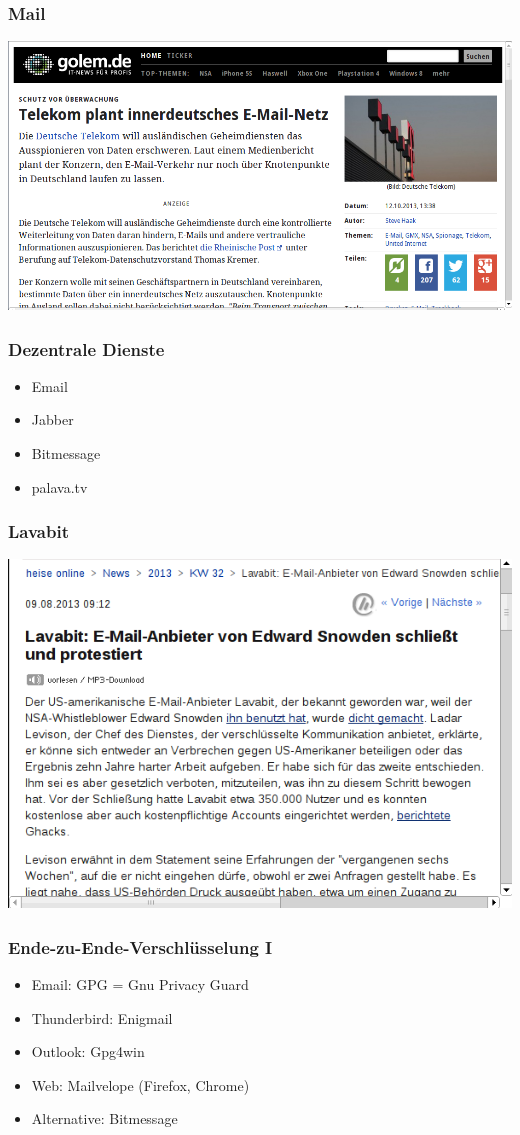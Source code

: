 \documentclass[12pt]{beamer}
\begin{document}
\begin{frame}
    \frametitle{Mail}
    \includegraphics[height=0.7\textheight]{img/telekom_mail.png}
\end{frame}

\begin{frame}
  \frametitle{Dezentrale Dienste}
    \begin{itemize}
      \item<2-> Email
      \item<3-> Jabber
      \item<4-> Bitmessage
      \item<5-> palava.tv
    \end{itemize}
\end{frame}

\begin{frame}
    \frametitle{Lavabit}
    \includegraphics[height=0.6\textheight]{img/heise_lavabit.png}
\end{frame}

\begin{frame}
    \frametitle{Ende-zu-Ende-Verschlüsselung I}
    \begin{itemize}\Large
      \item Email: GPG = Gnu Privacy Guard
      \item Thunderbird: Enigmail
      \item Outlook: Gpg4win
      \item Web: Mailvelope (Firefox, Chrome)
      \item Alternative: Bitmessage
    \end{itemize}
\end{frame}
\end{document}
